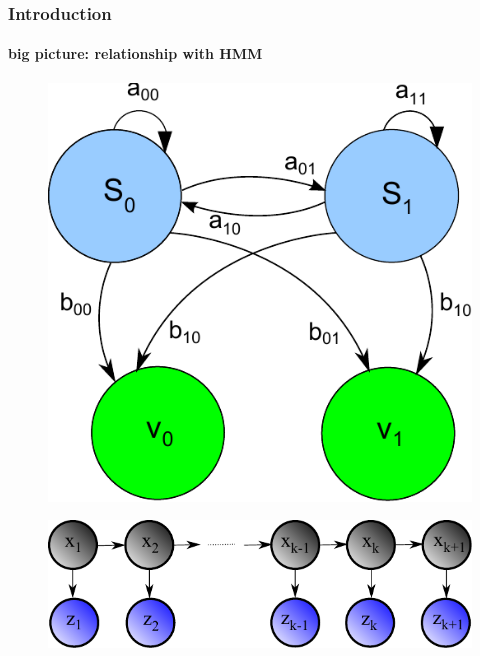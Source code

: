 \begin{frame}
\frametitle{Introduction}
\framesubtitle{big picture: relationship with HMM}
\logoCSIPCPL\mypagenum
	\begin{figure}
		\includegraphics[height=0.3\textheight]{figs/HMM_flowDiagram.pdf}
	\end{figure}
	\begin{figure}
		\includegraphics[width=1.0\textwidth]{figs/HMM_flowDiagram2.pdf}
	\end{figure}
\end{frame}




